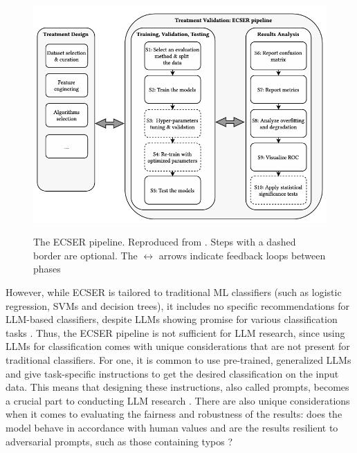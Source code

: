 \documentclass[a4paper]{article}
\begin{document}
\begin{figure}[h]
    \centering
    \caption{The ECSER pipeline. Reproduced from \textcite{Dellanna2022}. Steps with a dashed border are optional. The $\leftrightarrow$ arrows indicate feedback loops between phases}
    \includegraphics[width=0.8\linewidth]{figures/ECSER.png}
    \label{fig:ECSER}
\end{figure}


However, while ECSER is tailored to traditional ML classifiers (such as logistic regression, SVMs and decision trees), it includes no specific recommendations for LLM-based classifiers, despite LLMs showing promise for various classification tasks \cite{Guo2024health,fields2024}. Thus, the ECSER pipeline is not sufficient for LLM research, since using LLMs for classification comes with unique considerations that are not present for traditional classifiers. For one, it is common to use pre-trained, generalized LLMs and give task-specific instructions to get the desired classification on the input data. This means that designing these instructions, also called prompts, becomes a crucial part to conducting LLM research \cite{Marvin2024}. There are also unique considerations when it comes to evaluating the fairness and robustness of the results: does the model behave in accordance with human values and are the results resilient to adversarial prompts, such as those containing typos \cite{Woodworth2017,zhu2024}?
\end{document}
